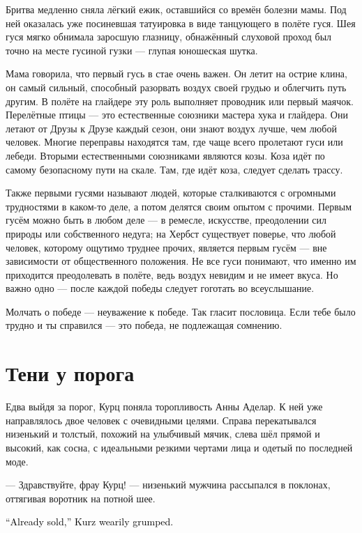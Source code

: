 \documentclass[a4paper,10pt,fleqn]{book}\usepackage{polyglossia}\setdefaultlanguage{english}\setotherlanguage{russian}\defaultfontfeatures{Ligatures=TeX,Mapping=tex-text}\usepackage{xcolor}\definecolor{lightgray}{HTML}{bbbbbb}\color{lightgray}\newcommand{\ml}[3]{\textcolor{black}{#3}}
\begin{document}
Бритва медленно сняла лёгкий ежик, оставшийся со времён болезни мамы.
Под ней оказалась уже посиневшая татуировка в виде танцующего в полёте гуся.
Шея гуся мягко обнимала заросшую глазницу, обнажённый слуховой проход был точно на месте гусиной гузки --- глупая юношеская шутка.

Мама говорила, что первый гусь в стае очень важен.
Он летит на острие клина, он самый сильный, способный разорвать воздух своей грудью и облегчить путь другим.
В полёте на глайдере эту роль выполняет проводник или первый маячок.
Перелётные птицы --- это естественные союзники мастера хука и глайдера.
Они летают от Друзы к Друзе каждый сезон, они знают воздух лучше, чем любой человек.
Многие переправы находятся там, где чаще всего пролетают гуси или лебеди.
Вторыми естественными союзниками являются козы.
Коза идёт по самому безопасному пути на скале.
Там, где идёт коза, следует сделать трассу.

Также первыми гусями называют людей, которые сталкиваются с огромными трудностями в каком-то деле, а потом делятся своим опытом с прочими.
Первым гусём можно быть в любом деле --- в ремесле, искусстве, преодолении сил природы или собственного недуга;
на Хербст существует поверье, что любой человек, которому ощутимо труднее прочих, является первым гусём --- вне зависимости от общественного положения.
Не все гуси понимают, что именно им приходится преодолевать в полёте, ведь воздух невидим и не имеет вкуса.
Но важно одно --- после каждой победы следует гоготать во всеуслышание.

Молчать о победе --- неуважение к победе.
Так гласит пословица.
Если тебе было трудно и ты справился --- это победа, не подлежащая сомнению.

\section{Тени у порога}

Едва выйдя за порог, Курц поняла торопливость Анны Аделар.
К ней уже направлялось двое человек с очевидными целями.
Справа перекатывался низенький и толстый, похожий на улыбчивый мячик, слева шёл прямой и высокий, как сосна, с идеальными резкими чертами лица и одетый по последней моде.

--- Здравствуйте, фрау Курц! --- низенький мужчина рассыпался в поклонах, оттягивая воротник на потной шее.

\ml{$0$}
{--- Уже продала, --- устало буркнула Курц.}
{``Already sold,'' Kurz wearily grumped.}
\end{document}
